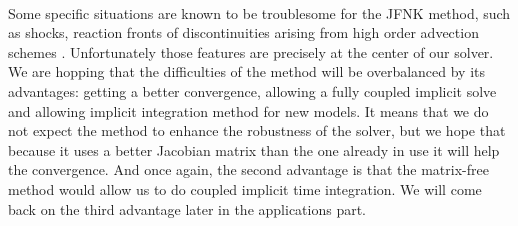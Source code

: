       \paragraph{}
      Some specific situations are known to be troublesome for the JFNK method, such as shocks, reaction fronts of discontinuities arising from high order advection schemes \cite{KnollKeyes2004}.
      Unfortunately those features are precisely at the center of our solver.
      We are hopping that the difficulties of the method will be overbalanced by its advantages: getting a better convergence, allowing a fully coupled implicit solve and allowing implicit integration method for new models.
      It means that we do not expect the method to enhance the robustness of the solver, but we hope that because it uses a better Jacobian matrix than the one already in use it will help the convergence.
      And once again, the second advantage is that the matrix-free method would allow us to do coupled implicit time integration.
      We will come back on the third advantage later in the applications part.
